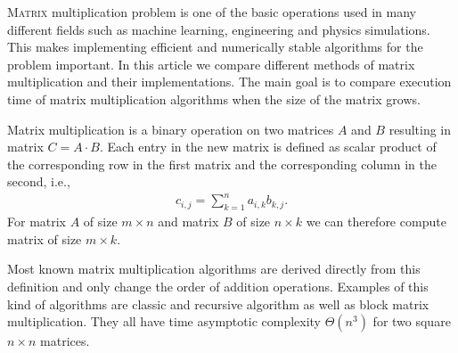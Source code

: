 \documentclass[a4paper,11pt]{article}
\begin{document}
\lettrine{M}{atrix} multiplication problem
is one of the basic operations used in many different fields such 
as machine learning, engineering and physics simulations.
This makes implementing efficient and numerically stable algorithms for the problem important. 
In this article we compare different methods of matrix multiplication and their implementations. 
The main goal is to compare execution time of matrix multiplication algorithms when the size of the matrix grows.








Matrix multiplication is a binary operation on two matrices 
$A$ and $B$ resulting in matrix $C=A \cdot B$. Each entry in the new matrix is defined as scalar product of the corresponding row in the first matrix and the corresponding column in the second, i.e.,
\begin{align*}
c_{i,j} = \sum_{k=1}^{n} a_{i,k} b_{k,j}.
\end{align*}
For matrix $A$ of size $m \times n$ and matrix $B$ of size $n \times k$ we can therefore compute matrix %
of size $m \times k$.

Most known matrix multiplication algorithms are derived directly from this definition and only change the order of addition operations. 
Examples of this kind of algorithms are classic and recursive algorithm as well as block matrix multiplication.
They all have time asymptotic complexity $\Theta(n^3)$ for two square $n \times n$ matrices.
\end{document}
